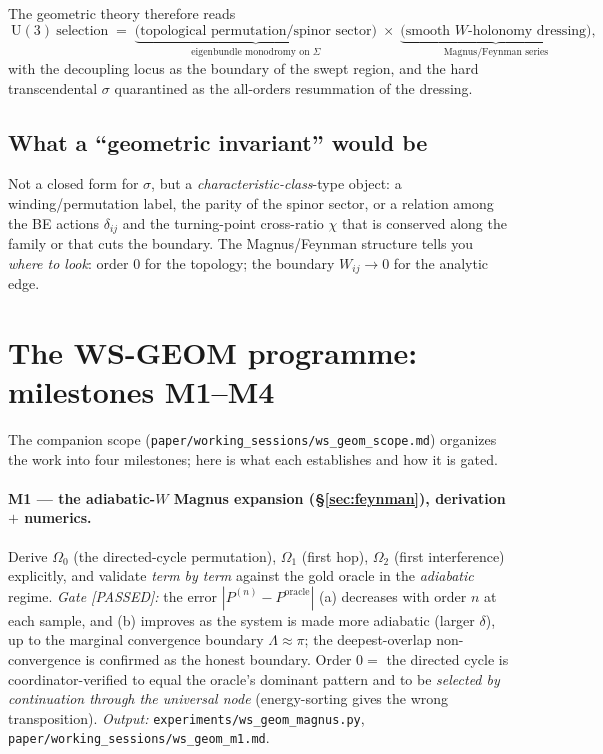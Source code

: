 \documentclass[11pt]{article}
\newcommand{\U}{\mathrm{U}}
\begin{document}
\noindent The geometric theory therefore reads
\begin{equation}
\boxed{\ \U(3)\ \text{selection}\;=\;
\underbrace{\big(\text{topological permutation/spinor sector}\big)}_{\text{eigenbundle monodromy on }\Sigma}
\;\times\;
\underbrace{\big(\text{smooth }W\text{-holonomy dressing}\big)}_{\text{Magnus/Feynman series}},\ }
\end{equation}
with the decoupling locus as the boundary of the swept region, and the hard transcendental $\sigma$
quarantined as the all-orders resummation of the dressing.

\subsection{What a ``geometric invariant'' would be}
Not a closed form for $\sigma$, but a \emph{characteristic-class}-type object: a winding/permutation label,
the parity of the spinor sector, or a relation among the BE actions $\delta_{ij}$ and the turning-point
cross-ratio $\chi$ that is conserved along the family or that cuts the boundary. The Magnus/Feynman
structure tells you \emph{where to look}: order $0$ for the topology; the boundary $W_{ij}\to0$ for the
analytic edge.

\section{The WS-GEOM programme: milestones M1--M4}\label{sec:milestones}
The companion scope (\texttt{paper/working\_sessions/ws\_geom\_scope.md}) organizes the work into four milestones; here is
what each establishes and how it is gated.

\paragraph{M1 --- the adiabatic-$W$ Magnus expansion (\S\ref{sec:feynman}), derivation $+$ numerics.}
Derive $\Omega_0$ (the directed-cycle permutation), $\Omega_1$ (first hop), $\Omega_2$ (first interference)
explicitly, and validate \emph{term by term} against the gold oracle in the \emph{adiabatic} regime.
\emph{Gate [PASSED]:} the error $|P^{(n)}-P^{\mathrm{oracle}}|$ (a) decreases with order $n$ at each
sample, and (b) improves as the system is made more adiabatic (larger $\delta$), up to the marginal
convergence boundary $\Lambda\!\approx\!\pi$; the deepest-overlap non-convergence is confirmed as the honest
boundary. Order $0=$ the directed cycle is coordinator-verified to equal the oracle's dominant pattern and
to be \emph{selected by continuation through the universal node} (energy-sorting gives the wrong
transposition). \emph{Output:} \texttt{experiments/ws\_geom\_magnus.py}, \texttt{paper/working\_sessions/ws\_geom\_m1.md}.
\end{document}
